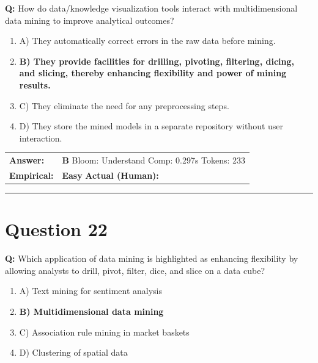\documentclass[9pt]{article}
\begin{document}
\textbf{Q:} How do data/knowledge visualization tools interact with multidimensional data mining to improve analytical outcomes?

\begin{enumerate}[label=\textbf{\alph{*})}, nosep]
    \item A) They automatically correct errors in the raw data before mining.
    \item \textbf{B) They provide facilities for drilling, pivoting, filtering, dicing, and slicing, thereby enhancing flexibility and power of mining results.} %
    \item C) They eliminate the need for any preprocessing steps.
    \item D) They store the mined models in a separate repository without user interaction.

\end{enumerate}

\begin{tabular}{@{}l p{10.5cm}@{}}
\textbf{Answer:} & \textbf{B} \hspace{1em} Bloom: Understand \hspace{1em} Comp: 0.297s \hspace{1em} Tokens: 233 \\
\textbf{Empirical:} & \textbf{Easy} \hspace{1em} \textbf{Actual (Human):} \underline{\hspace{5cm}}
\end{tabular}

\vspace{0.2cm}
\rule{\textwidth}{0.4pt}
\vspace{0.2cm}


\section*{Question 22}

\textbf{Q:} Which application of data mining is highlighted as enhancing flexibility by allowing analysts to drill, pivot, filter, dice, and slice on a data cube?

\begin{enumerate}[label=\textbf{\alph{*})}, nosep]
    \item A) Text mining for sentiment analysis
    \item \textbf{B) Multidimensional data mining} %
    \item C) Association rule mining in market baskets
    \item D) Clustering of spatial data

\end{enumerate}
\end{document}
